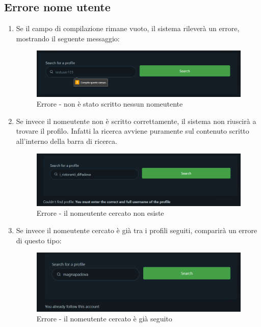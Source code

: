 {    \subsection{Errore nome utente} {
    \begin{enumerate}
        \item Se il campo di compilazione rimane vuoto, il sistema rileverà un errore, mostrando il seguente messaggio: 
        \begin{figure}[H]
            \includegraphics[width=12cm]{sezioni/images/err1-add.png}
            \centering
            \caption{Errore - non è stato scritto nessun nomeutente}
        \end{figure}
        \item Se invece il nomeutente non è scritto correttamente, il sistema non riuscirà a trovare il profilo. Infatti la ricerca avviene puramente sul contenuto scritto all'interno della barra di ricerca.
        \begin{figure}[H]
            \includegraphics[width=12cm]{sezioni/images/err2-add.png}
            \centering
            \caption{Errore - il nomeutente cercato non esiste}
        \end{figure}
        \item Se invece il nomeutente cercato è già tra i profili seguiti, comparirà un errore di questo tipo:
        \begin{figure}[H]
            \includegraphics[width=12cm]{sezioni/images/err3-add.png}
            \centering
            \caption{Errore - il nomeutente cercato è già seguito}
        \end{figure}
    \end{enumerate}
    }
}
